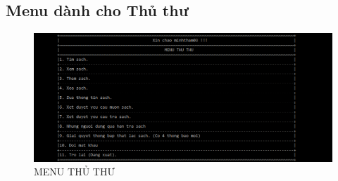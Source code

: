 \documentclass[16pt,a4paper,oneside]{article}
\begin{document}
\subsection{Menu dành cho Thủ thư}
\begin{figure}[htp]
	\begin{center}
		\includegraphics[width=18cm]{Images/menu_thuthu.png}
		\caption{MENU THỦ THƯ}
	\end{center}
\end{figure}
\end{document}
